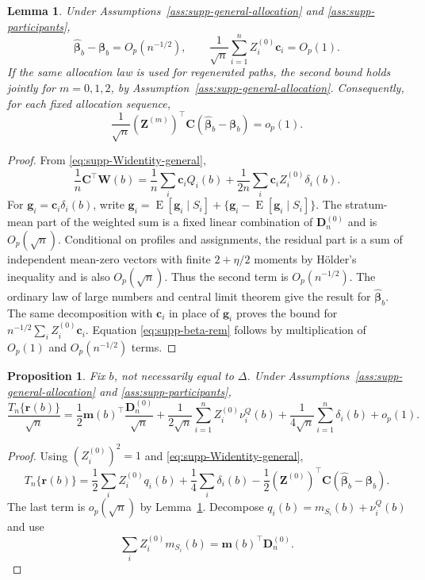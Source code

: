 \documentclass[12pt,a4paper]{article}
\newtheorem{proposition}{Proposition}
\newtheorem{lemma}{Lemma}
\theoremstyle{definition}
\theoremstyle{remark}\newtheorem{remark}{Remark}
\numberwithin{equation}{section}
\newcommand{\E}{\operatorname{E}}
\begin{document}
\begin{lemma}\label{lem:supp-beta-general}
Under Assumptions~\ref{ass:supp-general-allocation} and \ref{ass:supp-participants},
\[
\widehat{\bm\beta}_b-\bm\beta_b=O_p(n^{-1/2}),
\qquad
\frac1{\sqrt n}\sum_{i=1}^nZ_i^{(0)}\bm c_i=O_p(1).
\]
If the same allocation law is used for regenerated paths, the
second bound holds jointly for $m=0,1,2$, by Assumption~\ref{ass:supp-general-allocation}.
Consequently, for each fixed allocation sequence,
\begin{equation}\label{eq:supp-beta-rem}
\frac1{\sqrt n}
(\bm Z^{(m)})^\top\bm C
(\widehat{\bm\beta}_b-\bm\beta_b)
=o_p(1).
\end{equation}
\end{lemma}

\begin{proof}
From \eqref{eq:supp-Widentity-general},
\[
\frac1n\bm C^\top\bm W(b)
=\frac1n\sum_i\bm c_iQ_i(b)
+\frac1{2n}\sum_i\bm c_iZ_i^{(0)}\delta_i(b).
\]
For $\bm g_i=\bm c_i\delta_i(b)$, write
$\bm g_i=\E[\bm g_i\mid S_i]+\{\bm g_i-\E[\bm g_i\mid S_i]\}$. The stratum-mean part of the weighted sum is a fixed linear combination of $\bm D_n^{(0)}$ and is $O_p(\sqrt n)$. Conditional on profiles and assignments, the residual part is a sum of independent mean-zero vectors with finite $2+\eta/2$ moments by H\"older's inequality and is also $O_p(\sqrt n)$. Thus the second term is $O_p(n^{-1/2})$. The ordinary law of large numbers and central limit theorem give the result for $\widehat{\bm\beta}_b$. The same decomposition with $\bm c_i$ in place of $\bm g_i$ proves the bound for $n^{-1/2}\sum_iZ_i^{(0)}\bm c_i$. Equation \eqref{eq:supp-beta-rem} follows by multiplication of $O_p(1)$ and $O_p(n^{-1/2})$ terms.
\end{proof}

\begin{proposition}\label{prop:supp-observed-expansion}
Fix $b$, not necessarily equal to $\Delta$. Under Assumptions~\ref{ass:supp-general-allocation} and \ref{ass:supp-participants},
\begin{equation}\label{eq:supp-observed-expansion}
\frac{T_n\{\bm r(b)\}}{\sqrt n}
=
\frac12\bm m(b)^\top\frac{\bm D_n^{(0)}}{\sqrt n}
+\frac1{2\sqrt n}\sum_{i=1}^nZ_i^{(0)}\nu_i^Q(b)
+\frac1{4\sqrt n}\sum_{i=1}^n\delta_i(b)
+o_p(1).
\end{equation}
\end{proposition}

\begin{proof}
Using $(Z_i^{(0)})^2=1$ and \eqref{eq:supp-Widentity-general},
\[
T_n\{\bm r(b)\}
=\frac12\sum_iZ_i^{(0)}q_i(b)
+\frac14\sum_i\delta_i(b)
-\frac12(\bm Z^{(0)})^\top\bm C
(\widehat{\bm\beta}_b-\bm\beta_b).
\]
The last term is $o_p(\sqrt n)$ by Lemma~\ref{lem:supp-beta-general}. Decompose $q_i(b)=m_{S_i}(b)+\nu_i^Q(b)$ and use
\[
\sum_iZ_i^{(0)}m_{S_i}(b)=\bm m(b)^\top\bm D_n^{(0)}.
\]
\end{proof}
\end{document}
